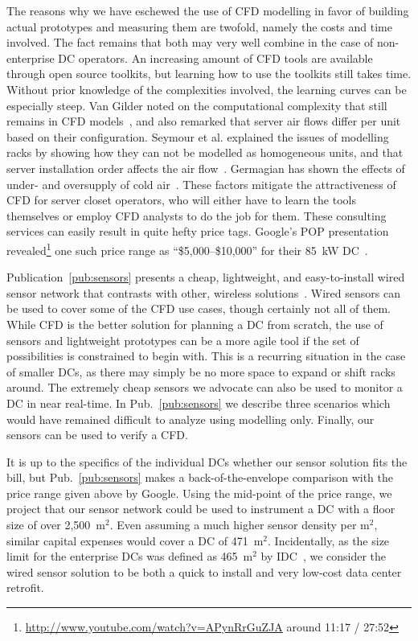 \documentclass[officiallayout]{tktla}
\begin{document}
The reasons why we have eschewed the use of CFD modelling in favor of building
actual prototypes and measuring them are twofold, namely the costs and time
involved. The fact remains that both may very well combine in the case of
non-enterprise DC operators. An increasing amount of CFD tools are available
through open source toolkits, but learning how to use the toolkits still takes
time. Without prior knowledge of the complexities involved, the learning
curves can be especially steep. Van Gilder noted on the computational
complexity that still remains in CFD models~\cite{VanGilder2011}, and also
remarked that server air flows differ per unit based on their configuration.
Seymour et al.  explained the issues of modelling racks by showing how they
can not be modelled as homogeneous units, and that server installation order
affects the air flow~\cite{Seymour2011}. Germagian has shown the effects of
under- and oversupply of cold air~\cite{Germagian2009}.  These factors
mitigate the attractiveness of CFD for server closet operators, who will
either have to learn the tools themselves or employ CFD analysts to do the job
for them.  These consulting services can easily result in quite hefty price
tags.  Google's POP presentation
revealed\footnote{\url{http://www.youtube.com/watch?v=APynRrGuZJA} around
11:17 / 27:52} one such price range as ``\$5,000--\$10,000'' for their 85~kW
DC~\cite{Google2011}. 

Publication~\ref{pub:sensors} presents a cheap, lightweight, and
easy-to-install wired sensor network that contrasts with other, wireless
solutions~\cite{Liu2012a}. Wired sensors can be used to cover some of the CFD
use cases, though certainly not all of them. While CFD is the better solution
for planning a DC from scratch, the use of sensors and lightweight prototypes
can be a more agile tool if the set of possibilities is constrained to begin
with.  This is a recurring situation in the case of smaller DCs, as there may
simply be no more space to expand or shift racks around. The extremely cheap
sensors we advocate can also be used to monitor a DC in near real-time. In
Pub.~\ref{pub:sensors} we describe three scenarios which would have remained
difficult to analyze using modelling only.  Finally, our sensors can be used
to verify a CFD.

It is up to the specifics of the individual DCs whether our sensor solution
fits the bill, but Pub.~\ref{pub:sensors} makes a back-of-the-envelope
comparison with the price range given above by Google. Using the mid-point of
the price range, we project that our sensor network could be used to
instrument a DC with a floor size of over 2,500~m$^2$. Even assuming a much
higher sensor density per m$^2$, similar capital expenses would cover a DC of
471~m$^2$. Incidentally, as the size limit for the enterprise DCs was defined
as 465~m$^2$ by IDC~\cite{Bailey2006}, we consider the wired sensor solution
to be both a quick to install and very low-cost data center retrofit.
\end{document}
